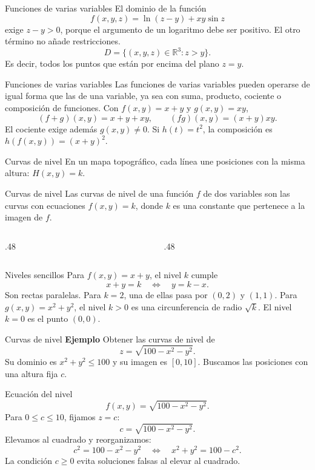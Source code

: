 \begin{frame}{Funciones de varias variables}
El dominio de la función
\[f(x,y,z)=\ln(z-y)+xy\sin z\]
exige $z-y>0$, porque el argumento de un logaritmo debe ser positivo. El otro término no añade restricciones.
\[D=\{(x,y,z)\in\mathbb{R}^3:z>y\}.\]
Es decir, todos los puntos que están por encima del plano $z=y$.
\end{frame}
\begin{frame}{Funciones de varias variables}
Las funciones de varias variables pueden operarse de igual forma que las de una variable, ya sea con suma, producto, cociente o composición de funciones.
\medskip
Con $f(x,y)=x+y$ y $g(x,y)=xy$,
\[(f+g)(x,y)=x+y+xy,\qquad (fg)(x,y)=(x+y)xy.\]
El cociente exige además $g(x,y)\ne0$.
\medskip
Si $h(t)=t^2$, la composición es $h(f(x,y))=(x+y)^2$.
\end{frame}
\begin{frame}{Curvas de nivel}
En un mapa topográfico, cada línea une posiciones con la misma altura: $H(x,y)=k$.
\end{frame}
\begin{frame}{Curvas de nivel}
Las curvas de nivel de una función $f$ de dos variables son las curvas con ecuaciones $f(x,y)=k$, donde $k$ es una constante que pertenece a la imagen de $f$.
\begin{columns}[c]
\begin{column}{.48\textwidth}\end{column}
\begin{column}{.48\textwidth}\end{column}
\end{columns}
\end{frame}
\begin{frame}{Niveles sencillos}
Para $f(x,y)=x+y$, el nivel $k$ cumple
\[x+y=k\quad\Longleftrightarrow\quad y=k-x.\]
Son rectas paralelas. Para $k=2$, una de ellas pasa por $(0,2)$ y $(1,1)$.
\medskip
Para $g(x,y)=x^2+y^2$, el nivel $k>0$ es una circunferencia de radio $\sqrt k$. El nivel $k=0$ es el punto $(0,0)$.
\end{frame}
\begin{frame}{Curvas de nivel}
\textbf{Ejemplo}
\vfill
Obtener las curvas de nivel de
\[z=\sqrt{100-x^2-y^2}.\]
Su dominio es $x^2+y^2\le100$ y su imagen es $[0,10]$.
\medskip
Buscamos las posiciones con una altura fija $c$.
\vfill
\end{frame}
\begin{frame}{Ecuación del nivel}
\[f(x,y)=\sqrt{100-x^2-y^2}.\]
Para $0\le c\le10$, fijamos $z=c$:
\[c=\sqrt{100-x^2-y^2}.\]
Elevamos al cuadrado y reorganizamos:
\[c^2=100-x^2-y^2\quad\Longleftrightarrow\quad x^2+y^2=100-c^2.\]
La condición $c\ge0$ evita soluciones falsas al elevar al cuadrado.
\end{frame}
